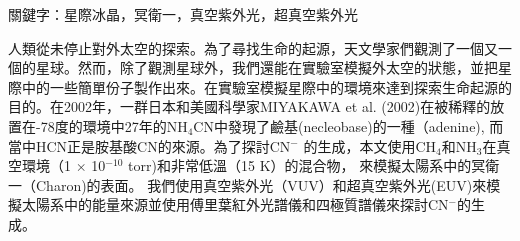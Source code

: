 \begin{abstractcn}

關鍵字：星際冰晶，冥衛一，真空紫外光，超真空紫外光
\vspace{2em}

人類從未停止對外太空的探索。為了尋找生命的起源，天文學家們觀測了一個又一個的星球。然而，除了觀測星球外，我們還能在實驗室模擬外太空的狀態，並把星際中的一些簡單份子製作出來。在實驗室模擬星際中的環境來達到探索生命起源的目的。在2002年，一群日本和美國科學家MIYAKAWA et al. (2002)\cite{miyakawa2002cold}在被稀釋的放置在-78度的環境中27年的NH$_4$CN中發現了鹼基(necleobase)的一種（adenine), 而當中HCN正是胺基酸CN的來源。為了探討CN$^-$ 的生成，本文使用CH$_4$和NH$_3$在真空環境（1 $\times$ 10$^{-10}$ torr)和非常低溫（15 K）的混合物， 來模擬太陽系中的冥衛一（Charon)的表面。 我們使用真空紫外光（VUV）和超真空紫外光(EUV)來模擬太陽系中的能量來源並使用傅里葉紅外光譜儀和四極質譜儀來探討CN$^-$的生成。

\end{abstractcn} 
